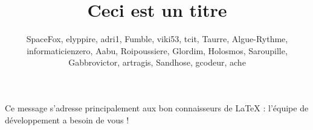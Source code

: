 \documentclass[small]{zmdocument}
\title{Ceci est un titre}
\author{SpaceFox, elyppire, adri1, Fumble, viki53, tcit, Taurre, Algue-Rythme, informaticienzero, Aabu, Roipoussiere, Glordim, Holosmos, Saroupille, Gabbrovictor, artragis, Sandhose, gcodeur, ache}
\begin{document}
\maketitle
\tableofcontents
\newpage

\levelOneIntroduction

Ce message s’adresse principalement aux bon connaisseurs de LaTeX : l’équipe de développement a besoin de vous ! 
\end{document}
